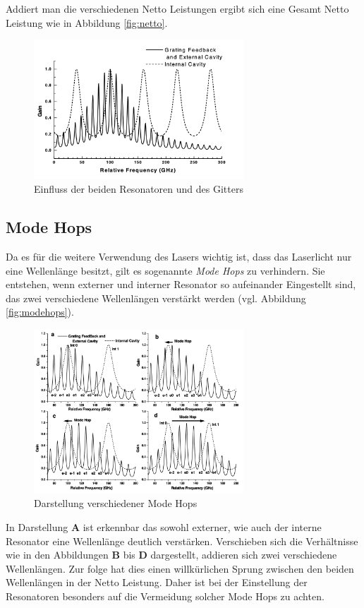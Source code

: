 Addiert man die verschiedenen Netto Leistungen ergibt sich eine Gesamt Netto Leistung wie in Abbildung \eqref{fig:netto}.
\begin{figure}
    \centering
    \includegraphics[width=0.7\textwidth]{abb/netto.png}
    \caption{Einfluss der beiden Resonatoren und des Gitters \cite{laser}}
    \label{fig:netto}
\end{figure}

\subsection{Mode Hops}
Da es für die weitere Verwendung des Lasers wichtig ist,
dass das Laserlicht nur eine Wellenlänge besitzt,
gilt es sogenannte \textit{Mode Hops} zu verhindern.
Sie entstehen, 
wenn externer und interner Resonator so aufeinander Eingestellt sind,
das zwei verschiedene Wellenlängen verstärkt werden (vgl. Abbildung \eqref{fig:modehops}).
\begin{figure}
    \centering
    \includegraphics[width=0.7\textwidth]{abb/modehops.png}
    \caption{Darstellung verschiedener Mode Hops \cite{laser}}
    \label{fig:modehops}
\end{figure}
In Darstellung \textbf{A} ist erkennbar das sowohl externer, wie auch der interne Resonator eine Wellenlänge deutlich verstärken.
Verschieben sich die Verhältnisse
wie in den Abbildungen \textbf{B} bis \textbf{D} dargestellt,
addieren sich zwei verschiedene Wellenlängen.
Zur folge hat dies einen willkürlichen Sprung zwischen den beiden Wellenlängen in der Netto Leistung.
Daher ist bei der Einstellung der Resonatoren besonders auf die Vermeidung solcher Mode Hops zu achten.



